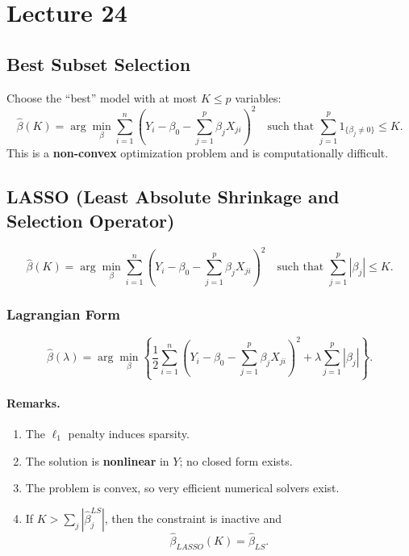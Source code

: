 \section{Lecture 24}

\subsection{Best Subset Selection}

Choose the \textquotedblleft best\textquotedblright{} model with at most $K \le p$ variables:
\[
    \hat{\beta}(K)
    = \arg\min_{\beta}
        \sum_{i=1}^n (Y_i - \beta_0 - \sum_{j=1}^p \beta_j X_{ji})^2
    \quad \text{such that } 
    \sum_{j=1}^p 1_{\{\beta_j \neq 0\}} \le K.
\]
This is a \textbf{non-convex} optimization problem and is computationally difficult.

\subsection{LASSO (Least Absolute Shrinkage and Selection Operator)}

\[
    \hat{\beta}(K)
    = \arg\min_{\beta}
        \sum_{i=1}^n (Y_i - \beta_0 - \sum_{j=1}^p \beta_j X_{ji})^2
    \quad \text{such that }
        \sum_{j=1}^p |\beta_j| \le K.
\]

\subsubsection{Lagrangian Form}

\[
    \hat{\beta}(\lambda)
    = \arg\min_{\beta}
        \left\{
        \frac{1}{2} \sum_{i=1}^n (Y_i - \beta_0 - \sum_{j=1}^p \beta_j X_{ji})^2
        + \lambda \sum_{j=1}^p |\beta_j|
        \right\}.
\]

\paragraph{Remarks.}
\begin{enumerate}
    \item The $\ell_1$ penalty induces sparsity.
    \item The solution is \textbf{nonlinear} in $Y$; no closed form exists.
    \item The problem is convex, so very efficient numerical solvers exist.
    \item If $K > \sum_j |\hat{\beta}^{LS}_j|$, then the constraint is inactive and  
        \[
            \hat{\beta}_{LASSO}(K) = \hat{\beta}_{LS}.
        \]
\end{enumerate}

